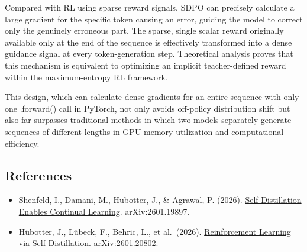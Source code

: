 Compared with RL using sparse reward signals, SDPO can precisely calculate a large gradient for the specific token causing an error, guiding the model to correct only the genuinely erroneous part. The sparse, single scalar reward originally available only at the end of the sequence is effectively transformed into a dense guidance signal at every token-generation step. Theoretical analysis proves that this mechanism is equivalent to optimizing an implicit teacher-defined reward within the maximum-entropy RL framework.

This design, which can calculate dense gradients for an entire sequence with only one .forward() call in PyTorch, not only avoids off-policy distribution shift but also far surpasses traditional methods in which two models separately generate sequences of different lengths in GPU-memory utilization and computational efficiency.

\FloatBarrier
{}
\hypertarget{references-105}{%
\subsection{References}\label{references-105}}

\vspace{0.25em}
\begin{itemize}
\tightlist
\item
  Shenfeld, I., Damani, M., Hubotter, J., \& Agrawal, P. (2026). \href{https://arxiv.org/abs/2601.19897}{Self-Distillation Enables Continual Learning}. arXiv:2601.19897.
\item
  Hübotter, J., Lübeck, F., Behric, L., et al.~(2026). \href{https://arxiv.org/abs/2601.20802}{Reinforcement Learning via Self-Distillation}. arXiv:2601.20802.
\end{itemize}

\clearpage
